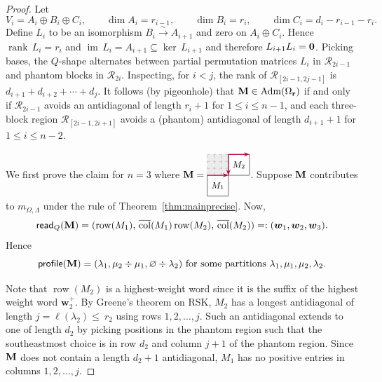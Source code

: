 \documentclass[12pt]{amsart}
\newcommand{\bs}{\boldsymbol}
\DeclareMathOperator{\Std}{\operatorname{Adm}}
\newcommand{\cell}{.28}
\newcommand{\phantomtile}[5]{%
\begin{scope}[shift={(#1,#2)}]
  \fill[gray!15] (0,0) rectangle ({#3*\cell},{#4*\cell});
  \draw[gray!70, dashed, step=\cell] (0,0) grid ({#3*\cell},{#4*\cell});
  #5
\end{scope}
}
\theoremstyle{definition}
\theoremstyle{remark}
\begin{document}
\begin{proof} Let 
\[V_i=A_i\oplus B_i\oplus C_i, \qquad \dim A_i=r_{i-1}, \qquad \dim B_i = r_i, \qquad \dim C_i=d_i-r_{i-1}-r_i.\] 
Define $L_i$ to be an isomorphism 
$B_i\xrightarrow{\sim} A_{i+1}$ and
zero on $A_i\oplus C_i$. Hence $\operatorname{rank} \, L_i=r_i$ and $\operatorname{im} \, L_i
=A_{i+1}\subseteq \operatorname{ker} \, L_{i+1}$ and therefore $L_{i+1}L_i={\bf 0}$. 
Picking bases, the $Q$-shape alternates between 
partial permutation matrices $L_i$ in ${\mathcal R}_{2i-1}$ and phantom blocks in ${\mathcal R}_{2i}$. 
Inspecting, for $i<j$, the rank of ${\mathcal R}_{[2i-1,2j-1]}$ is 
$d_{i+1}+d_{i+2}+\cdots+d_{j}$. It follows (by pigeonhole) that
${\bf M}\in \Std(\Omega_{\bf r})$ if and only if ${\mathcal R}_{2i-1}$ avoids
an antidiagonal of length $r_i+1$  for $1\leq i\leq n-1$, and each three-block region ${\mathcal R}_{[2i-1,2i+1]}$ avoids 
a (phantom) antidiagonal of length $d_{i+1}+1$ for $1\leq i\leq n-2$.

We first prove the claim for $n=3$ where 
${\bf M} =\vcenter{\hbox{\begin{tikzpicture}[scale=.9, baseline=-.5ex]
\draw (0,0) rectangle (.84,.84);
\node at (.42,.42) {\small{$M_1$}};

{\phantomtile{0}{.84}{3}{3}{
}}

\draw (.84,.84) rectangle (1.68,1.68);
\node at (1.26,1.26) {\small{$M_2$}};


\draw[purple, -{Stealth[length=2mm,width=1.5mm]}, thick] (0,.84) -- (.84,.84);
\draw[purple, -{Stealth[length=2mm,width=1.5mm]}, thick] (.84,1.68) -- (.84,.84);
\draw[purple, -{Stealth[length=2mm,width=1.5mm]}, thick] (.84,1.68) -- (1.68,1.68);
\end{tikzpicture}}}$.
Suppose ${\bf M}$ contributes to $m_{\Omega,\Lambda}$ under the rule of Theorem~\ref{thm:mainprecise}.
Now,
\[{\sf read}_Q({\bf M}) = (\operatorname{row}(M_1), \, \overline{\operatorname{col}}(M_1)\operatorname{row}(M_2), \,
\overline{\operatorname{col}}(M_2))=: ({\bs w}_1, {\bs w}_2, {\bs w}_3).\] 
Hence 
\[{\sf profile}({\bf M})= (\lambda_1, \mu_2\div \mu_1, \varnothing\div \lambda_2) \text{ for some partitions $\lambda_1,\mu_1,\mu_2,\lambda_2$.}\]

Note that $\operatorname{row}(M_2)$ is a highest-weight word since it is the suffix of the highest weight word
${\bs w}_2^{+}$. By Greene's theorem on RSK, $M_2$ has a longest antidiagonal of length
$j=\ell(\lambda_2)\leq~r_2$ using rows $1,2,\ldots,j$. Such an 
antidiagonal extends to one
of length $d_2$ by picking positions in the phantom region such that the southeastmost choice is in row $d_2$
and column $j+1$ of the phantom region. Since ${\bf M}$ does not contain a length $d_2+1$ antidiagonal, $M_1$ has no positive entries in columns $1,2,\ldots,j$. 


\end{proof}
\end{document}
